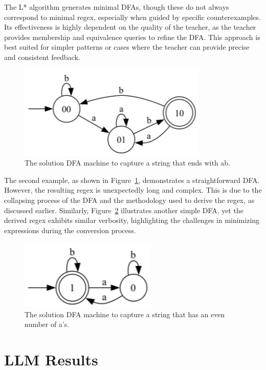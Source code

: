 The L* algorithm generates minimal DFAs, though these do not always correspond to minimal regex, especially when guided by specific counterexamples. Its effectiveness is highly dependent on the quality of the teacher, as the teacher provides membership and equivalence queries to refine the DFA. This approach is best suited for simpler patterns or cases where the teacher can provide precise and consistent feedback.

\begin{figure}[h!]
	\centering
	\includegraphics[width=9cm]{figures/ends_with_ab.png}
	\caption{The solution DFA machine to capture a string that ends with ab.}
	\label{fig:ends_with_ab}
\end{figure}

The second example, as shown in Figure~\ref{fig:ends_with_ab}, demonstrates a straightforward DFA. However, the resulting regex is unexpectedly long and complex. This is due to the collapsing process of the DFA and the methodology used to derive the regex, as discussed earlier. Similarly, Figure~\ref{fig:even_a} illustrates another simple DFA, yet the derived regex exhibits similar verbosity, highlighting the challenges in minimizing expressions during the conversion process.

\begin{figure}[h!]
	\centering
	\includegraphics[width=6.5cm]{figures/even_a.png}
	\caption{The solution DFA machine to capture a string that has an even number of a's.}
	\label{fig:even_a}
\end{figure}

\section{LLM Results}

